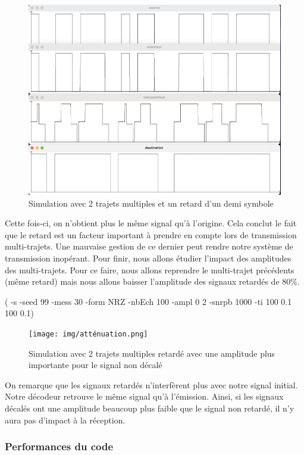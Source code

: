 \begin{figure}[H]
\centering
\includegraphics[width=\textwidth]{img/beaudecalage.png}
\caption{\label{fig:image25}Simulation avec 2 trajets multiples et un retard d'un demi symbole}
\end{figure}

Cette fois-ci, on n'obtient plus le même signal qu'à l'origine. Cela conclut le fait que le retard est un facteur important à prendre en compte lors de transmission multi-trajets. Une mauvaise gestion de ce dernier peut rendre notre système de transmission inopérant. 
Pour finir, nous allons étudier l'impact des amplitudes des multi-trajets. Pour ce faire, nous allons reprendre le multi-trajet précédents (même retard) mais nous allons baisser l'amplitude des signaux retardés de  80\%. 

( -s  -seed  99  -mess  30  -form  NRZ  -nbEch  100  -ampl  0  2  -snrpb  1000  -ti  100  0.1  100  0.1)

\begin{figure}[H]
\centering
\texttt{[image: img/atténuation.png]}
\caption{\label{fig:image25}Simulation avec 2 trajets multiples retardé avec une amplitude plus importante pour le signal non décalé}
\end{figure}

On remarque que les signaux retardés n'interfèrent plus avec notre signal initial. Notre décodeur retrouve le même signal qu'à l'émission. Ainsi, si les signaux décalés ont une amplitude beaucoup plus faible que le signal non retardé, il n'y aura pas d'impact à la réception.
\subsubsection{Performances du code}

